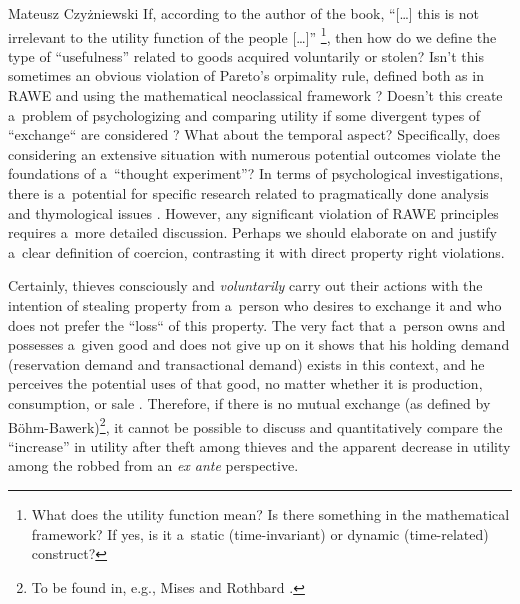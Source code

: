\begin{newrevengenv}{Mateusz Czyżniewski}
If, according to the author of the book, ``[…] this is not irrelevant to the utility function of the people […]'' 
\parencite[][p.60]{megger_sprawiedliwosc_2021}%
\footnote{What does the utility function mean? Is there something in the mathematical framework? If yes, is it a~static (time-invariant) or dynamic (time-related) construct? }, then how do we define the type of ``usefulness'' related to goods acquired voluntarily or stolen? Isn't this sometimes an obvious violation of Pareto's orpimality rule, defined both as in RAWE 
\parencite[][]{rothbard_toward_2008} %
 and using the mathematical neoclassical framework 
\parencite[][pp.~173--183, 203--256 \mbox{[orig. 1947]}]{samuelson_foundations_1971}? %
 Doesn't this create a~problem of psychologizing and comparing utility if some divergent types of ``exchange`` are considered 
\parencite[][]{hausman_impossibility_1995}? %
 What about the temporal aspect? Specifically, does considering an extensive situation with numerous potential outcomes violate the foundations of a~``thought experiment''? In terms of psychological investigations, there is a~potential for specific research related to pragmatically done analysis and thymological issues 
\parencite[][pp.~264--284, 303--320 \mbox{[1\textsuperscript{st} ed. 1957]}]{mises_theory_1997}. %
 However, any significant violation of RAWE principles requires a~more detailed discussion. Perhaps we should elaborate on and justify a~clear definition of coercion, contrasting it with direct property right violations.



Certainly, thieves consciously and \textit{voluntarily} carry out their actions with the intention of stealing property from a~person who desires to exchange it and who does not prefer the ``loss`` of this property. The very fact that a~person owns and possesses a~given good and does not give up on it shows that his holding demand (reservation demand and transactional demand) exists in this context, and he perceives the potential uses of that good, no matter whether it is production, consumption, or sale 
\parencite[][pp.137–142]{rothbard_man_2009}. %
 Therefore, if there is no mutual exchange (as defined by Böhm-Bawerk)\footnote{To be found in, e.g., Mises 
\parencite*[][pp.213–232, 268–316]{mises_human_1998} %
 and Rothbard 
\parencite*[][pp.95–169]{rothbard_man_2009}. %
 }, it cannot be possible to discuss and quantitatively compare the ``increase'' in utility after theft among thieves and the apparent decrease in utility among the robbed from an \textit{ex ante} perspective.




\end{newrevengenv}
